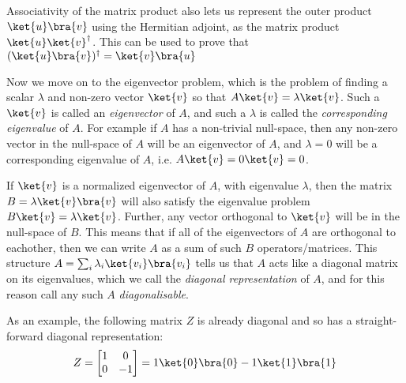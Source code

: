 Associativity of the matrix product also lets us represent the outer product $\ket{u}\bra{v}$ using the Hermitian adjoint, as the matrix product $\ket{u}\ket{v}^\dagger$. This can be used to prove that
$(\ket{u}\bra{v})^\dagger = \ket{v}\bra{u}$

Now we move on to the eigenvector problem, which is the problem of finding a scalar $\lambda$ and non-zero vector $\ket{v}$ so that $A\ket{v}=\lambda\ket{v}$. Such a $\ket{v}$ is called an \emph{eigenvector} of $A$, and such a $\lambda$ is called the \emph{corresponding eigenvalue} of $A$. For example if $A$ has a non-trivial null-space, then any non-zero vector in the null-space of $A$ will be an eigenvector of $A$, and $\lambda=0$ will be a corresponding eigenvalue of $A$, i.e. $A\ket{v} = 0\ket{v} = 0$.

If $\ket{v}$ is a normalized eigenvector of $A$, with eigenvalue $\lambda$, then the matrix $B=\lambda\ket{v}\bra{v}$ will also satisfy the eigenvalue problem $B\ket{v}=\lambda\ket{v}$. Further, any vector orthogonal to $\ket{v}$ will be in the null-space of $B$. This means that if all of the eigenvectors of $A$ are orthogonal to eachother, then we can write $A$ as a sum of such $B$ operators/matrices. This structure $A = \sum_i \lambda_i \ket{v_i}\bra{v_i}$ tells us that $A$ acts like a diagonal matrix on its eigenvalues, which we call the \emph{diagonal representation} of $A$, and for this reason call any such $A$ \emph{diagonalisable}.

As an example, the following matrix $Z$ is already diagonal and so has a straight-forward diagonal representation:
\begin{align*}
	Z = \left[\begin{matrix}
		1&0\\
		0&-1
	\end{matrix}\right] = 1\ket{0}\bra{0} - 1\ket{1}\bra{1}
\end{align*}

